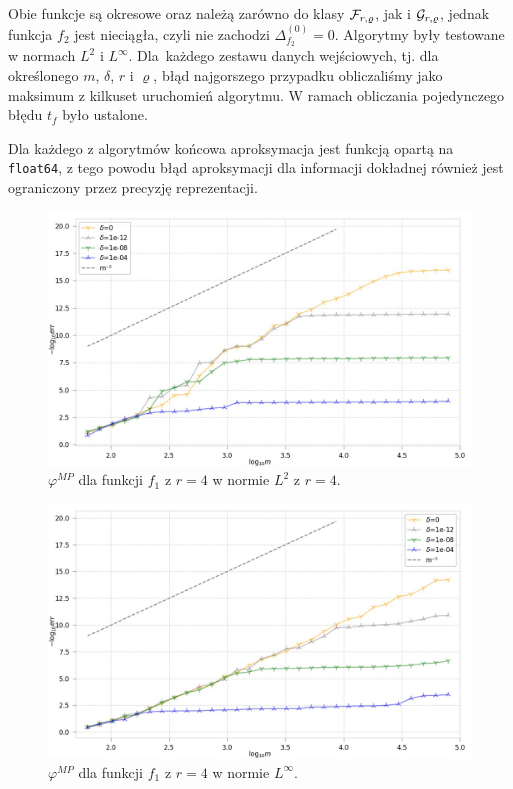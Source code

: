 \documentclass[oik, pdftex, man]{mgrwms}
\begin{document}
    Obie funkcje są okresowe oraz należą zarówno do klasy $\mathcal{F}_{r, \varrho}$, jak i $\mathcal{G}_{r,\varrho}$, jednak funkcja $f_{2}$ jest nieciągła, czyli nie zachodzi $\Delta_{f_{2}}^{(0)} = 0$. Algorytmy były testowane w normach $L^{2}$ i $L^{\infty}$. Dla~każdego zestawu danych wejściowych, tj. dla określonego $m$, $\delta$, $r$ i $\varrho$, błąd najgorszego przypadku obliczaliśmy jako maksimum z kilkuset uruchomień algorytmu. W ramach obliczania pojedynczego błędu $t_{f}$ było ustalone.

    Dla każdego z algorytmów końcowa aproksymacja jest funkcją opartą na \verb+float64+, z tego powodu błąd aproksymacji dla informacji dokładnej również jest ograniczony przez precyzję reprezentacji.

    \begin{figure}
        \centering
        \includegraphics[width=.9\linewidth]{alg2015/f_1/r_4/p_2/plot_30evaluation_0.jpg}
        \caption{$\varphi^{MP}$ dla funkcji $f_{1}$ z $r=4$ w normie $L^{2}$ z $r=4$.}
        \label{rys:1:algMP_p2}
    \end{figure}

    \begin{figure}
        \centering
        \includegraphics[width=.9\linewidth]{alg2015/f_1/r_4/p_infinity/plot_30evaluation_0.jpg}
        \caption{$\varphi^{MP}$ dla funkcji $f_{1}$ z $r=4$ w normie $L^{\infty}$.}
        \label{rys:2:algMP_pInf}
    \end{figure}
    
\end{document}
